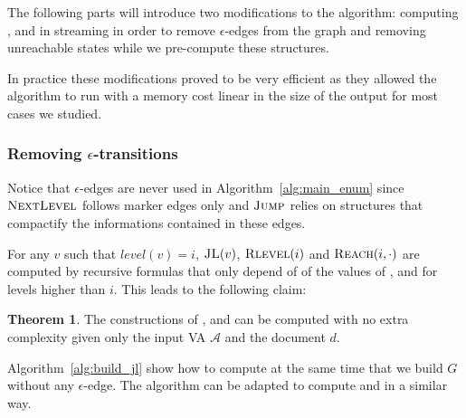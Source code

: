 \documentclass[11px]{article}
\theoremstyle{definition}
\newtheorem{theorem}{Theorem}
\begin{document}


      The following parts will introduce two modifications to the algorithm:
      computing ,  and  in
      streaming in order to remove $\epsilon$-edges from the graph and removing
      unreachable states while we pre-compute these structures.

      In practice these modifications proved to be very efficient as they
      allowed the algorithm to run with a memory cost linear in the size of the
      output for most cases we studied.

      \subsubsection{Removing $\epsilon$-transitions}

        Notice that $\epsilon$-edges are never used in
        Algorithm~\ref{alg:main_enum} since $\textproc{NextLevel}$ follows
        marker edges only and $\textproc{Jump}$ relies on structures that
        compactify the informations contained in these edges.

        For any $v$ such that $level(v) = i$, $\Call{JL}{v}$,
        $\Call{Rlevel}{i}$ and $\Call{Reach}{i, \cdot}$ are computed by
        recursive formulas that only depend of of the values of ,
         and  for levels higher than $i$. This
        leads to the following claim:

        \begin{theorem}
          The constructions of ,  and
           can be computed with no extra complexity given only
          the input VA $\mathcal{A}$ and the document $d$.
        \end{theorem}

        Algorithm~\ref{alg:build_jl} show how to compute  at the
        same time that we build $G$ without any $\epsilon$-edge. The algorithm
        can be adapted to compute  and  in a
        similar way.
\end{document}
